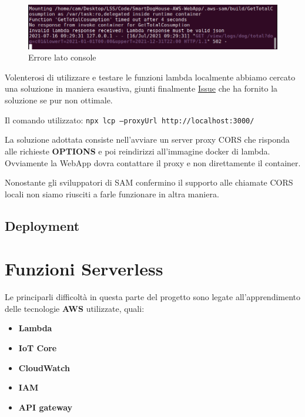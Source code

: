         \begin{figure}[H]
            \caption{Errore lato console}
            \label{fig:ErrorCorsConsole}
            \centering
            \includegraphics[width=1\textwidth]{Images/CorsErrorConsole.PNG}
        \end{figure}
    
        Volenterosi di utilizzare e testare le funzioni lambda localmente abbiamo cercato una soluzione in maniera esaustiva,
        giunti finalmente \href{https://github.com/aws/aws-sam-cli/issues/323#issuecomment-483650280}{Issue} che ha fornito la soluzione se pur non ottimale.
        
        Il comando utilizzato: \texttt{npx lcp --proxyUrl http://localhost:3000/}
        
        La soluzione adottata consiste nell'avviare un server proxy CORS che risponda alle richieste \textbf{OPTIONS} e poi reindirizzi all'immagine docker di lambda. 
        Ovviamente la WebApp dovra contattare il proxy e non direttamente il container.
        
        Nonostante gli sviluppatori di SAM confermino il supporto alle chiamate CORS locali non siamo riusciti a farle funzionare in altra maniera.
        
\subsection{Deployment} 
        
        
\section{Funzioni Serverless}
    Le principarli difficoltà in questa parte del progetto sono legate all'apprendimento delle tecnologie \textbf{AWS} utilizzate,
    quali:
    \begin{itemize}
        \item \textbf{Lambda}
        \item \textbf{IoT Core}
        \item \textbf{CloudWatch}
        \item \textbf{IAM}
        \item \textbf{API gateway}
    \end{itemize}
    




